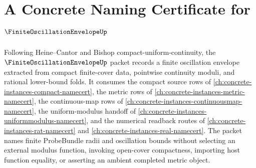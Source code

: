 \chapter{A Concrete Naming Certificate for $\FiniteOscillationEnvelopeUp$}
\label{ch:concrete-instances-finite-oscillation-envelope-namecert}

Following Heine--Cantor and Bishop compact-uniform-continuity, the $\FiniteOscillationEnvelopeUp$ packet records a finite oscillation envelope extracted from compact finite-cover data, pointwise continuity moduli, and rational lower-bound folds. It consumes the compact source rows of \autoref{ch:concrete-instances-compact-namecert}, the metric rows of \autoref{ch:concrete-instances-metric-namecert}, the continuous-map rows of \autoref{ch:concrete-instances-continuousmap-namecert}, the uniform-modulus handoff of \autoref{ch:concrete-instances-uniformmodulus-namecert}, and the numerical readback routes of \autoref{ch:concrete-instances-rat-namecert} and \autoref{ch:concrete-instances-real-namecert}. The packet names finite ProbeBundle radii and oscillation bounds without selecting an external modulus function, invoking open-cover compactness, importing host function equality, or asserting an ambient completed metric object.

